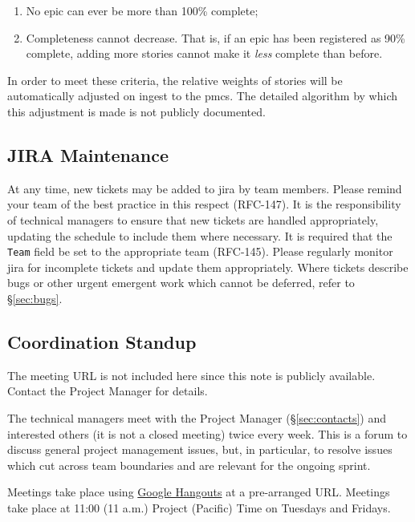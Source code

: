 \begin{enumerate}
\item
  No \gls{epic} can ever be more than 100\% complete;
\item
  Completeness cannot decrease.
  That is, if an \gls{epic} has been registered as 90\% complete, adding more stories cannot make it \emph{less} complete than before.
\end{enumerate}

In order to meet these criteria, the relative weights of stories will be automatically adjusted on ingest to the \gls{pmcs}.
The detailed algorithm by which this adjustment is made is not publicly documented.

\subsection{JIRA Maintenance}
\label{sec:jira-maintenance}

At any time, new tickets may be added to \gls{jira} by team members.
Please remind your team of the best practice in this respect (RFC-147).
It is the responsibility of technical managers to ensure that new tickets are handled appropriately, updating the schedule to include them where necessary.
It is required that the \texttt{Team} field be set to the appropriate team (RFC-145).
Please regularly monitor \gls{jira} for incomplete tickets and update them appropriately.
Where tickets describe bugs or other urgent emergent work which cannot be deferred, refer to \S\ref{sec:bugs}.

\subsection{Coordination Standup}\label{coordination-standup}

The meeting URL is not included here since this note is publicly
available. Contact the Project Manager for details.

The technical managers meet with the
Project Manager (\S\ref{sec:contacts}) and interested
others (it is not a closed meeting) twice every week. This is a forum to
discuss general project management issues, but, in particular, to
resolve issues which cut across team boundaries and are relevant for the
ongoing sprint.

Meetings take place using \href{https://hangouts.google.com/}{Google
Hangouts} at a pre-arranged URL. Meetings take place at 11:00 (11 a.m.)
Project (Pacific) Time on Tuesdays and Fridays.


